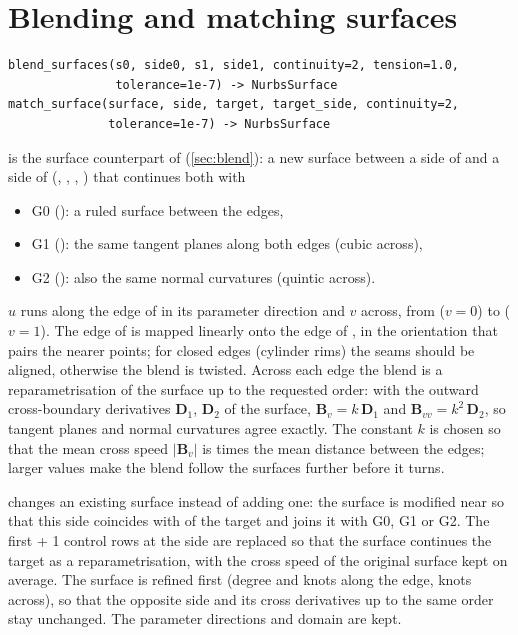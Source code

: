 \section{Blending and matching surfaces}\label{sec:surface-blend}

\begin{lstlisting}[style=text]
blend_surfaces(s0, side0, s1, side1, continuity=2, tension=1.0,
               tolerance=1e-7) -> NurbsSurface
match_surface(surface, side, target, target_side, continuity=2,
              tolerance=1e-7) -> NurbsSurface
\end{lstlisting}

 is the surface counterpart of 
(\cref{sec:blend}): a new surface between a side of  and a side of 
(, , , ) that continues both with
\begin{itemize}
  \item G0 (): a ruled surface between the edges,
  \item G1 (): the same tangent planes along both edges (cubic across),
  \item G2 (): also the same normal curvatures (quintic across).
\end{itemize}
$u$ runs along the edge of  in its parameter direction and $v$ across, from 
($v = 0$) to  ($v = 1$). The edge of  is mapped linearly onto the edge of
, in the orientation that pairs the nearer points; for closed edges (cylinder rims) the
seams should be aligned, otherwise the blend is twisted. Across each edge the blend is a
reparametrisation of the surface up to the requested order: with the outward cross-boundary
derivatives $\mathbf D_1$, $\mathbf D_2$ of the surface,
$\mathbf B_v = k\,\mathbf D_1$ and $\mathbf B_{vv} = k^2\,\mathbf D_2$, so tangent planes and
normal curvatures agree exactly. The constant $k$ is chosen so that the mean cross speed
$|\mathbf B_v|$ is  times the mean distance between the edges; larger values make
the blend follow the surfaces further before it turns.

 changes an existing surface instead of adding one: the surface is
modified near  so that this side coincides with  of the target and
joins it with G0, G1 or G2. The first  + 1 control rows at the side are
replaced so that the surface continues the target as a reparametrisation, with the cross speed
of the original surface kept on average. The surface is refined first (degree and knots along
the edge, knots across), so that the opposite side and its cross derivatives up to the same
order stay unchanged. The parameter directions and domain are kept.


